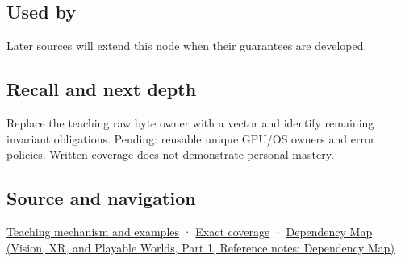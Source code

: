 \subsection{Used by}\label{appendix-7679107d057e-used-by}

\hypertarget{appendix-7679107d057e-used-by}{}

Later sources will extend this node when their guarantees are developed.

\subsection{Recall and next depth}\label{appendix-7679107d057e-recall-and-next-depth}

\hypertarget{appendix-7679107d057e-recall-and-next-depth}{}

Replace the teaching raw byte owner with a vector and identify remaining invariant obligations. Pending: reusable unique GPU/OS owners and error policies. Written coverage does not demonstrate personal mastery.

\subsection{Source and navigation}\label{appendix-7679107d057e-source-and-navigation}

\hypertarget{appendix-7679107d057e-source-and-navigation}{}

\hyperref[01-foundations-i-ch003-from-three-repairs-to-five-decisions-to-zero-boilerplate]{Teaching mechanism and examples} · \hyperref[appendix-fd090d982a15-m009---parts-127-147]{Exact coverage} · \href{../07-Vision-XR-and-Playable-Worlds-P01/main.pdf\#appendix-4ad47bdd269a}{Dependency Map (Vision, XR, and Playable Worlds, Part 1, Reference notes: Dependency Map)}
